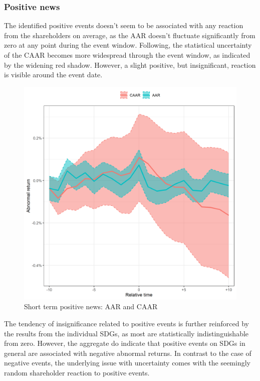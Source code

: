 \subsubsection{Positive news}

The identified positive events doesn't seem to be associated with any reaction from the shareholders on average, as the AAR doesn't fluctuate significantly from zero at any point during the event window. Following, the statistical uncertainty of the CAAR becomes more widespread through the event window, as indicated by the widening red shadow. However, a slight positive, but insignificant, reaction is visible around the event date. 

\begin{figure} [H] 
    \centering
    \includegraphics[scale=0.6]{Projekt/1.Figures analysis/ST_positive_all_CI.png}
    \caption{Short term positive news: AAR and CAAR}
    \label{fig:ST_pos_news}
\end{figure}


The tendency of insignificance related to positive events is further reinforced by the results from the individual SDGs, as most are statistically indistinguishable from zero. However, the aggregate do indicate that positive events on SDGs in general are associated with negative abnormal returns. In contrast to the case of negative events, the underlying issue with uncertainty comes with the seemingly random shareholder reaction to positive events.  
 

